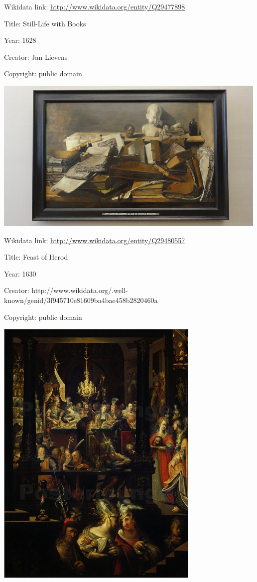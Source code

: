 \documentclass[
  letterpaper,
]{book}
\begin{document}
Wikidata link: \url{http://www.wikidata.org/entity/Q29477898}

Title: Still-Life with Books

Year: 1628

Creator: Jan Lievens

Copyright: public domain

\includegraphics{./paintings_files/figure-pdf/cell-2-output-12.png}

Wikidata link: \url{http://www.wikidata.org/entity/Q29480557}

Title: Feast of Herod

Year: 1630

Creator:
http://www.wikidata.org/.well-known/genid/3f945710e81609ba4bae458b2820460a

Copyright: public domain

\includegraphics{./paintings_files/figure-pdf/cell-2-output-14.png}
\end{document}
